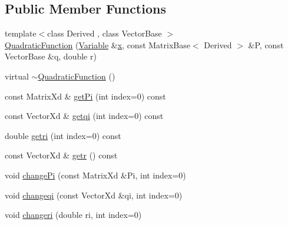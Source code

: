 \subsection*{Public Member Functions}
\begin{DoxyCompactItemize}
\item 
{\footnotesize template$<$class Derived , class Vector\+Base $>$ }\\\hyperlink{classocra_1_1QuadraticFunction_a9955f993dd22831561b3b67767f72a0d}{Quadratic\+Function} (\hyperlink{classocra_1_1Variable}{Variable} \&\hyperlink{classocra_1_1Function_a28825886d1f149c87b112ec2ec1dd486}{x}, const Matrix\+Base$<$ Derived $>$ \&P, const Vector\+Base \&q, double r)
\item 
virtual \hyperlink{classocra_1_1QuadraticFunction_a84bd0afec5679c1620170a97fd1be648}{$\sim$\+Quadratic\+Function} ()
\item 
const Matrix\+Xd \& \hyperlink{classocra_1_1QuadraticFunction_aa848353fa3e2a2330acdf3fa5b3f8ee3}{get\+Pi} (int index=0) const
\item 
const Vector\+Xd \& \hyperlink{classocra_1_1QuadraticFunction_a5735e7a900aabcf856e9df0c00e0cd06}{getqi} (int index=0) const
\item 
double \hyperlink{classocra_1_1QuadraticFunction_a5b3500ab19d92999b51de585b73cbf58}{getri} (int index=0) const
\item 
const Vector\+Xd \& \hyperlink{classocra_1_1QuadraticFunction_a5e5e98d00ae2c3249954d6a9a262686f}{getr} () const
\item 
void \hyperlink{classocra_1_1QuadraticFunction_ab2a6c4e433226c423f7a3dff95f68998}{change\+Pi} (const Matrix\+Xd \&Pi, int index=0)
\item 
void \hyperlink{classocra_1_1QuadraticFunction_a338c4fb88dd0a11cf63ff76ed572c895}{changeqi} (const Vector\+Xd \&qi, int index=0)
\item 
void \hyperlink{classocra_1_1QuadraticFunction_a5322e69813282ff9af8a13d00f4cebfc}{changeri} (double ri, int index=0)
\end{DoxyCompactItemize}
